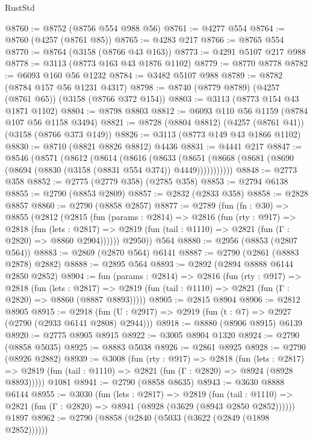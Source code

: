 \begin{lexlean}{RustStd}
\begin{coremodule}
@8760 := @8752 (@8756 @554 @988 @56)
@8761 := @4277 @554
@8764 := @8760 (@4257 (@8761 @85))
@8765 := @4283 @217
@8766 := @8765 @554
@8770 := @8764 (@3158 (@8766 @43 @163))
@8773 := @4291 @5107 @217 @988
@8778 := @3113 (@8773 @163 @43 @1876 @1102)
@8779 := @8770 @8778
@8782 := @6093 @160 @56 @1232
@8784 := @3482 @5107 @988
@8789 := @8782 (@8784 @157 @56 @1231 @4317)
@8798 := @8740 (@8779 @8789) (@4257 (@8761 @65)) (@3158 (@8766 @372 @154))
@8803 := @3113 (@8773 @154 @43 @1871 @1102)
@8804 := @8798 @8803
@8812 := @6093 @110 @56 @1159 (@8784 @107 @56 @1158 @3494)
@8821 := @8728 (@8804 @8812) (@4257 (@8761 @41)) (@3158 (@8766 @373 @149))
@8826 := @3113 (@8773 @149 @43 @1866 @1102)
@8830 := @8710 (@8821 @8826 @8812) @4436
@8831 := @4441 @217
@8847 := @8546
    (@8571
      (@8612
        (@8614
          (@8616
            (@8633
              (@8651 (@8668 (@8681 (@8690 (@8694 (@8830 (@3158 (@8831 @554 @374)) @4449)))))))))))
@8848 := @2773 @358
@8852 := @2775 (@2779 @358) (@2785 @358)
@8853 := @2794 @6138
@8855 := @2790 (@8853 @2809)
@8857 := @2832 (@2833 @358)
@8858 := @2828 @8857
@8860 := @2790 (@8858 @2857)
@8877 := @2789
    (fun (fn : @30) =>
    @8855
      (@2812
        (@2815
          (fun (params : @2814) =>
          @2816
            (fun (rty : @917) =>
            @2818
              (fun (lets : @2817) =>
              @2819 (fun (tail : @1110) => @2821 (fun (Γ : @2820) => @8860 @2904))))))
        @2950))
    @564
@8880 := @2956 (@8853 (@2807 @564))
@8883 := @2869 (@2870 @564) @6141
@8887 := @2790 (@2861 (@8883 @2878) @2882)
@8888 := @2895 @564
@8893 := @2892 (@2894 @8888 @6144 @2850 @2852)
@8904 := fun (params : @2814) =>
  @2816
    (fun (rty : @917) =>
    @2818
      (fun (lets : @2817) =>
      @2819 (fun (tail : @1110) => @2821 (fun (Γ : @2820) => @8860 (@8887 @8893)))))
@8905 := @2815 @8904
@8906 := @2812 @8905
@8915 := @2918 (fun (U : @2917) => @2919 (fun (t : @7) => @2927 (@2790 (@2933 @6141 @2808) @2944)))
@8918 := @8880 (@8906 @8915) @6139
@8920 := @2775 @8905 @8915
@8922 := @3005 @8904 @1320
@8924 := @2790 (@8858 @5035)
@8925 := @8883 @5038
@8926 := @2861 @8925
@8928 := @2790 (@8926 @2882)
@8939 := @3008
    (fun (rty : @917) =>
    @2818
      (fun (lets : @2817) =>
      @2819 (fun (tail : @1110) => @2821 (fun (Γ : @2820) => @8924 (@8928 @8893)))))
    @1081
@8941 := @2790 (@8858 @8635)
@8943 := @3630 @8888 @6144
@8955 := @3030
    (fun (lets : @2817) =>
    @2819
      (fun (tail : @1110) => @2821 (fun (Γ : @2820) => @8941 (@8928 (@3629 (@8943 @2850 @2852))))))
    @1897
@8962 := @2790 (@8858 (@2840 (@5033 (@3622 (@2849 (@1898 @2852))))))

\end{coremodule}
\end{lexlean}
